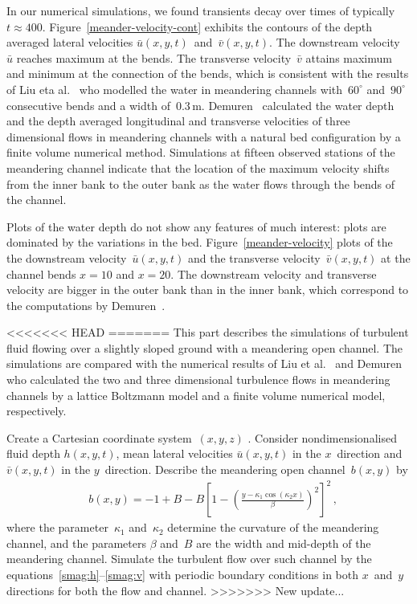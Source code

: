 \documentclass[twocolumn]{afmc_art}
\newcommand{\uu}{{\bar u}}
\newcommand{\vv}{{\bar v}}
\begin{document}
In our numerical simulations, we found transients decay over times of typically \(t\approx400\).
Figure~\ref{meander-velocity-cont} exhibits the contours of the depth averaged lateral velocities $\uu(x,y,t)$~and~$\vv(x,y,t)$. 
The downstream velocity~$\uu$ reaches maximum at the bends.
The transverse velocity~$\vv$ attains maximum and minimum at the connection of the bends, which is consistent with the results of Liu eta al.~\cite{Liu2009} who modelled the water in meandering channels with~$60^\circ$ and~$90^\circ$ consecutive bends and a width of~$0.3$\,m.
Demuren~\cite{Demuren1993} calculated the water depth and the depth averaged longitudinal and transverse velocities of three dimensional flows in meandering channels with a natural bed configuration by a finite volume numerical method. 
Simulations at fifteen observed stations of the meandering channel indicate that the location of the maximum velocity shifts from the inner bank to the outer bank as the water flows through the bends of the channel. 

Plots of the water depth do not show any features of much interest: plots are dominated by the variations in the bed.
Figure~\ref{meander-velocity} plots of the the downstream velocity~$\uu(x,y,t)$ and the transverse velocity~$\vv(x,y,t)$ at the channel bends $x=10$ and $x=20$.
The downstream velocity and transverse velocity are bigger in the outer bank than in the inner bank, which correspond to the computations by Demuren~\cite{Demuren1993}. 

<<<<<<< HEAD
=======
This part describes the simulations of turbulent fluid flowing over a slightly sloped ground with a meandering open channel. 
The simulations are compared with the numerical results of Liu et al.~\cite{Liu2009} and Demuren~\cite{Demuren1993} who calculated the two and three dimensional turbulence flows in meandering channels by a lattice Boltzmann model and a finite volume numerical model, respectively.

Create a Cartesian coordinate system~$(x,y,z)$ . 
Consider nondimensionalised fluid depth $h(x,y,t)$, mean lateral velocities $\uu(x,y,t)$ in the $x$~direction and $\vv(x,y,t)$ in the $y$~direction. 
Describe the meandering open channel~$b(x,y)$ by
\begin{align}&
b(x,y)=-1+B-B\left[1-\left(\frac{y-\kappa_1\cos(\kappa_2x)}{\beta}\right)^2\right]^2\,,\label{bed:meander}
\end{align}
where the parameter~$\kappa_1$ and~$\kappa_2$ determine the curvature of the meandering channel, and the parameters $\beta$ and~$B$ are the width and mid-depth of the meandering channel.
Simulate the turbulent flow over such channel by the equations~\eqref{smag:h}--\eqref{smag:v} with periodic boundary conditions in both $x$~and~$y$ directions for both the flow and channel. 
>>>>>>> New update...
\end{document}
